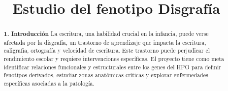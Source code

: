 \documentclass{bmcart}
\begin{document}
	\begin{frontmatter}
	
		\begin{fmbox}
			
			
			\title{Estudio del fenotipo Disgrafía}
			
			
			\author[
			  addressref={aff1},                   %
			  corref={aff1},                       %
			  email={nmartins@uma.es}   %
			]{ } %
			\author[
			  addressref={aff1},
			  email={belopcarlos@uma.es}
			]{ }
			
			\author[
			addressref={aff1},
			email={?@uma.es}
			]{ }
			
			
			
			\address[id=aff1]{%
			  ,             %
			  ,          %
			  ,                              %
			}
		
		\end{fmbox}%
		
		\begin{abstractbox}
		
			\begin{abstract} %
			
	
			\textbf{1. Introducción}
			La escritura, una habilidad crucial en la infancia, puede verse afectada por la disgrafía, un trastorno de aprendizaje que impacta la escritura, caligrafía, ortografía y velocidad de escritura. Este trastorno puede perjudicar el rendimiento escolar y requiere intervenciones específicas. El proyecto tiene como meta identificar relaciones funcionales y estructurales entre los genes del HPO para definir fenotipos derivados, estudiar zonas anatómicas críticas y explorar enfermedades específicas asociadas a la patología.
			

\end{abstract}
\end{abstractbox}
\end{frontmatter}
\end{document}
